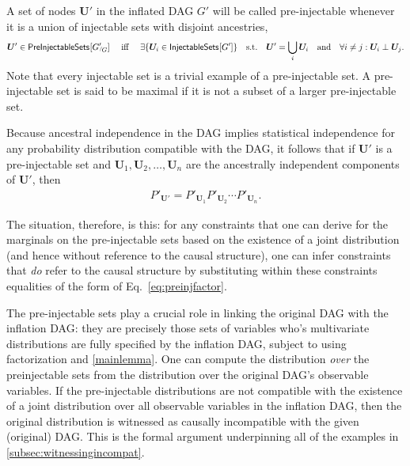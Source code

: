 A set of nodes $\bm{U}'$ in the inflated DAG $G'$ will be called pre-injectable whenever it is a union of injectable sets with disjoint ancestries,
\begin{align}\label{eq:defpreinj}
\bm{U}'\in{\operatorname{\mathsf{PreInjectableSets}}_{}}\lbrack{G'}_{\!\!^{/\!}G}\rbrack \quad\text{ iff }\quad  \exists \{ \bm{U}_i \in {\operatorname{\mathsf{InjectableSets}}_{}}\lbrack G'\rbrack \} \quad \text{s.t.}\quad \bm{U}'=\bigcup_i \bm{U}_i  \quad\text{and} \quad  \forall i\ne j: \bm{U}_i \perp \bm{U}_j.
\end{align}
Note that every injectable set is a trivial example of a pre-injectable set.  A pre-injectable set is said to be maximal if it is not a subset of a larger pre-injectable set.

Because ancestral independence in the DAG implies statistical independence for any probability distribution compatible with the DAG, it follows that  if 
$\bm{U}'$ is a pre-injectable set and $\bm{U}_1,\bm{U}_2,\ldots,\bm{U}_n$ are the ancestrally independent components of $\bm{U}'$, then 
\begin{align}\label{eq:preinjfactor}
P'_{\bm{U}'} = P'_{\bm{U}_1} P'_{\bm{U}_2}  \cdots P'_{\bm{U}_n}.
\end{align}

The situation, therefore, is this: for any constraints that one can derive for the marginals on the pre-injectable sets based on the existence of a joint distribution (and hence without reference to the causal structure), one can infer constraints that {\em do} refer to the causal structure by substituting within these constraints equalities of the form of Eq.~\eqref{eq:preinjfactor}.  

The pre-injectable sets play a crucial role in linking the original DAG with the inflation DAG: they are precisely those sets of variables who's multivariate distributions are fully specified by the inflation DAG, subject to using factorization and \cref{mainlemma}. One can compute the distribution \emph{over} the preinjectable sets from the distribution over the original DAG's observable variables. If the pre-injectable distributions are not compatible with the existence of a joint distribution over all observable variables in the inflation DAG, then the original distribution is witnessed as causally incompatible with the given (original) DAG. This is the formal argument underpinning all of the examples in \cref{subsec:witnessingincompat}.

